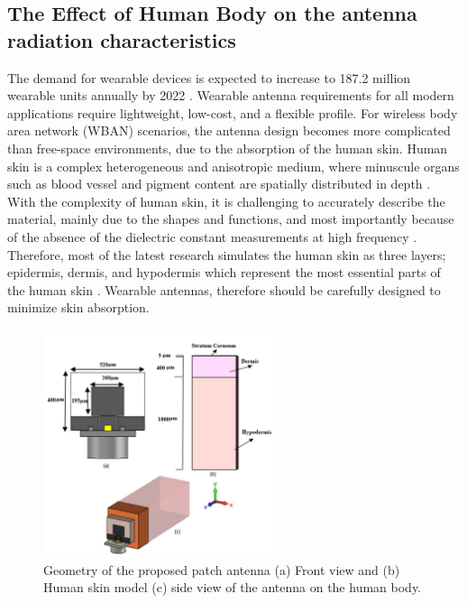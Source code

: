 \documentclass[12pt]{suhbook}
\begin{document}
\subsection{The Effect of Human Body on the antenna radiation characteristics}
% 
% 
The demand for wearable devices is expected to increase to \num{187.2}  million wearable units annually by \num{2022} \cite{hernandez2019wearable}. Wearable antenna requirements for all modern applications require lightweight, low-cost, and a flexible profile. For wireless body area network (WBAN) scenarios, the antenna design becomes more complicated than free-space environments, due to the absorption of the human skin. Human skin is a complex heterogeneous and anisotropic medium, where minuscule organs such as blood vessel and pigment content are spatially distributed in depth \cite{flynn2011modeling}. With the complexity of human skin, it is challenging to accurately describe the material, mainly due to the shapes and functions, and most importantly because of the absence of the dielectric constant measurements at high frequency \cite{alekseev2007human}. Therefore, most of the latest research simulates the human skin as three layers; epidermis, dermis, and hypodermis which represent the most essential parts of the human skin \cite{lynch1989growth}. Wearable antennas, therefore should be carefully designed to minimize skin absorption.
% 
\begin{figure}[hbt!]
\centering
\includegraphics[width=0.6\textwidth]{8}
\caption{Geometry of the proposed patch antenna (a) Front view and (b) Human skin model (c) side view of the antenna on the human body.}
\label{Fig 8}
\end{figure}
% 
\end{document}
